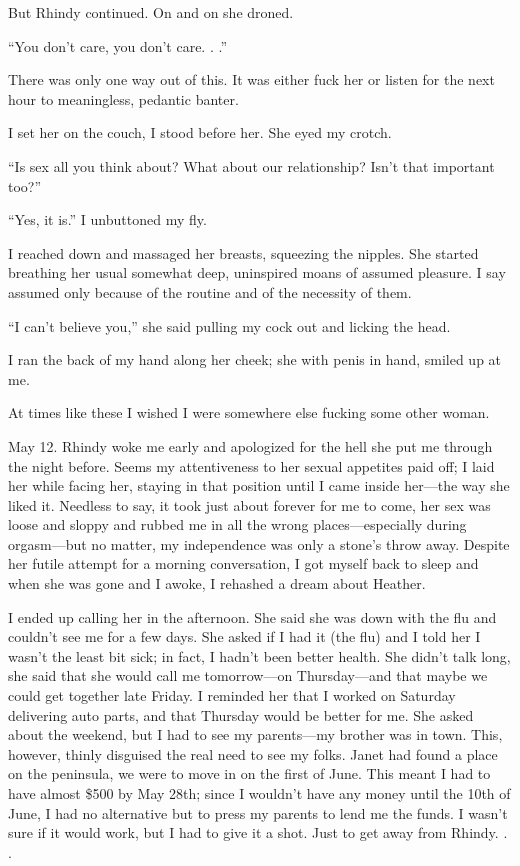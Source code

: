 But Rhindy continued. On and on she droned.

``You don't care, you don't care. . .''

There was only one way out of this. It was either fuck her or listen for
the next hour to meaningless, pedantic banter.

I set her on the couch, I stood before her. She eyed my crotch.

``Is sex all you think about? What about our relationship? Isn't that
important too?''

``Yes, it is.'' I unbuttoned my fly.

I reached down and massaged her breasts, squeezing the nipples. She
started breathing her usual somewhat deep, uninspired moans of assumed
pleasure. I say assumed only because of the routine and of the necessity
of them.

``I can't believe you,'' she said pulling my cock out and licking the
head.

I ran the back of my hand along her cheek; she with penis in hand,
smiled up at me.

At times like these I wished I were somewhere else fucking some other
woman.

May 12. Rhindy woke me early and apologized for the hell she put me
through the night before. Seems my attentiveness to her sexual appetites
paid off; I laid her while facing her, staying in that position until I
came inside her---the way she liked it. Needless to say, it took just
about forever for me to come, her sex was loose and sloppy and rubbed me
in all the wrong places---especially during orgasm---but no matter, my
independence was only a stone's throw away. Despite her futile attempt
for a morning conversation, I got myself back to sleep and when she was
gone and I awoke, I rehashed a dream about Heather.

I ended up calling her in the afternoon. She said she was down with the
flu and couldn't see me for a few days. She asked if I had it (the flu)
and I told her I wasn't the least bit sick; in fact, I hadn't been
better health. She didn't talk long, she said that she would call me
tomorrow---on Thursday---and that maybe we could get together late
Friday. I reminded her that I worked on Saturday delivering auto parts,
and that Thursday would be better for me. She asked about the weekend,
but I had to see my parents---my brother was in town. This, however,
thinly disguised the real need to see my folks. Janet had found a place
on the peninsula, we were to move in on the first of June. This meant I
had to have almost \$500 by May 28th; since I wouldn't have any money
until the 10th of June, I had no alternative but to press my parents to
lend me the funds. I wasn't sure if it would work, but I had to give it
a shot. Just to get away from Rhindy. . .

